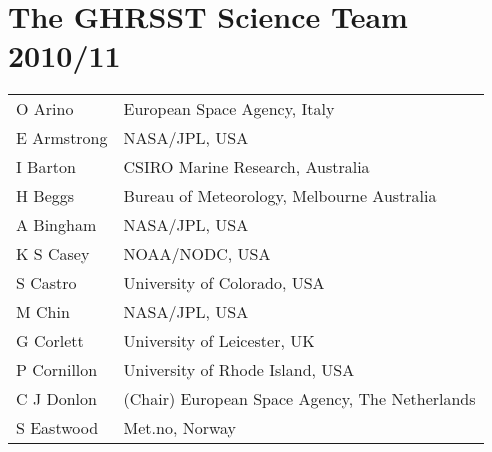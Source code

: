 \pagebreak
\section{The GHRSST Science Team 2010/11}
\begin{tabular}{ l  l }
O Arino & European Space Agency, Italy\\
E Armstrong & NASA/JPL, USA\\
I Barton & CSIRO Marine Research, Australia\\
H Beggs & Bureau of Meteorology, Melbourne Australia\\
A Bingham & NASA/JPL, USA\\
K S Casey & NOAA/NODC, USA\\
S Castro & University of Colorado, USA\\
M Chin & NASA/JPL, USA\\
G Corlett & University of Leicester, UK\\
P Cornillon & University of Rhode Island, USA\\
C J Donlon & (Chair) European Space Agency, The Netherlands\\
S Eastwood &  Met.no, Norway\\
\end{tabular}